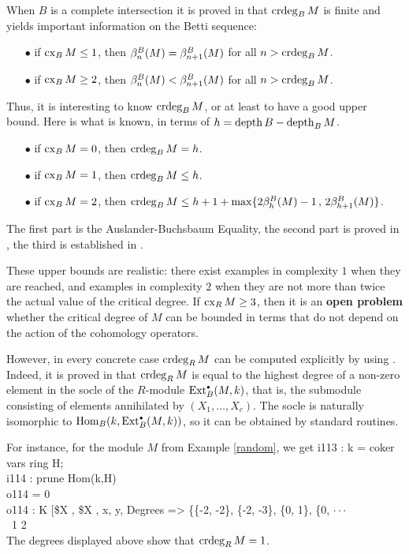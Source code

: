 When $B$ is a complete intersection it is proved in
\cite[Sect.~7]{CI:MR99c:13033} that $\operatorname{crdeg}_BM$ is finite and yields
important information on the Betti sequence:
\begin{itemize}
\item[$\bullet$]
if $\operatorname{cx}_BM\le1$, then $\beta^B_n(M) =\beta^B_{n+1}(M)$ for all $n>\operatorname{crdeg}_BM$.
\item[$\bullet$]
if $\operatorname{cx}_BM\ge2$, then $\beta^B_n(M)<\beta^B_{n+1}(M)$ for all $n>\operatorname{crdeg}_BM$.
\end{itemize}
Thus, it is interesting to know $\operatorname{crdeg}_BM$, or at least to have a good
upper bound.  Here is what is known, in terms of $h=\operatorname{depth} B-\operatorname{depth}_BM$.
\begin{itemize}
\item[$\bullet$]
if $\operatorname{cx}_BM=0$, then $\operatorname{crdeg}_BM=h$.
\item[$\bullet$]
if $\operatorname{cx}_BM=1$, then $\operatorname{crdeg}_BM\le h$.
\item[$\bullet$]
if $\operatorname{cx}_BM=2$, then $\operatorname{crdeg}_BM\le h+1+\max\{2\beta^B_h(M)-1\,,\,
2\beta^B_{h+1}(M)\}$.
\end{itemize}
The first part is the Auslander-Buchsbaum Equality, the second part is
proved in \cite[Sect.~6]{CI:Ei}, the third is established in
\cite[Sect.~7]{CI:MR1774757}.

These upper bounds are realistic:  there exist examples in complexity
$1$ when they are reached, and examples in complexity $2$ when they are
not more than twice the actual value of the critical degree.  If
$\operatorname{cx}_RM\ge3$, then it is an {\bf open problem} whether the critical
degree of $M$ can be bounded in terms that do not depend on the action
of the cohomology operators.

However, in every concrete case $\operatorname{crdeg}_RM$ can be computed explicitly
by using \Mtwo.  Indeed, it is proved in \cite[Sect.~7]{CI:MR99c:13033}
that $\operatorname{crdeg}_RM$ is equal to the highest degree of a non-zero element
in the socle of the $R$-module $\operatorname{Ext}^{\scriptscriptstyle\bullet}_B(M,k)$, that is, the
submodule consisting of elements annihilated by $(X_1,\dots,X_c)$.  The
socle is naturally isomorphic to $\operatorname{Hom}_B(k,\operatorname{Ext}^{\scriptscriptstyle\bullet}_B(M,k))$, so it can
be obtained by standard \Mtwo routines.

For instance, for the module $M$ from Example \ref{random}, we get
\beginOutput
i113 : k = coker vars ring H;\\
\endOutput
\beginOutput
i114 : prune Hom(k,H)\\
\emptyLine
o114 = 0\\
\emptyLine
o114 : K [\$X , \$X , x, y, Degrees => \{\{-2, -2\}, \{-2, -3\}, \{0, 1\}, \{0,  $\cdot\cdot\cdot$\\
\            1    2\\
\endOutput
The degrees displayed above show that $\operatorname{crdeg}_RM=1$.
\medskip

